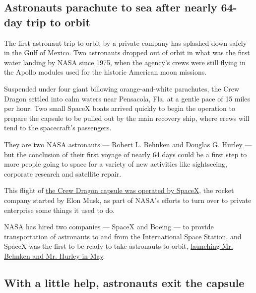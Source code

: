 \hypertarget{astronauts-parachute-to-sea-after-nearly-64-day-trip-to-orbit}{%
\subsection{Astronauts parachute to sea after nearly 64-day trip to
orbit}\label{astronauts-parachute-to-sea-after-nearly-64-day-trip-to-orbit}}

The first astronaut trip to orbit by a private company has splashed down
safely in the Gulf of Mexico. Two astronauts dropped out of orbit in
what was the first water landing by NASA since 1975, when the agency's
crews were still flying in the Apollo modules used for the historic
American moon missions.

Suspended under four giant billowing orange-and-white parachutes, the
Crew Dragon settled into calm waters near Pensacola, Fla. at a gentle
pace of 15 miles per hour. Two small SpaceX boats arrived quickly to
begin the operation to prepare the capsule to be pulled out by the main
recovery ship, where crews will tend to the spacecraft's passengers.

They are two NASA astronauts ---
\href{https://www.nytimes3xbfgragh.onion/2020/05/27/science/bob-behnken-doug-hurley.html}{Robert
L. Behnken and Douglas G. Hurley} --- but the conclusion of their first
voyage of nearly 64 days could be a first step to more people going to
space for a variety of new activities like sightseeing, corporate
research and satellite repair.

This flight of
\href{https://www.nytimes3xbfgragh.onion/interactive/2020/05/26/science/spacex-nasa.html}{the
Crew Dragon capsule was operated by SpaceX}, the rocket company started
by Elon Musk, as part of NASA's efforts to turn over to private
enterprise some things it used to do.

NASA has hired two companies --- SpaceX and Boeing --- to provide
transportation of astronauts to and from the International Space
Station, and SpaceX was the first to be ready to take astronauts to
orbit,
\href{https://www.nytimes3xbfgragh.onion/2020/05/30/science/spacex-nasa-astronauts.html}{launching
Mr. Behnken and Mr. Hurley in May}.

\hypertarget{with-a-little-help-astronauts-exit-the-capsule}{%
\subsection{With a little help, astronauts exit the
capsule}\label{with-a-little-help-astronauts-exit-the-capsule}}

